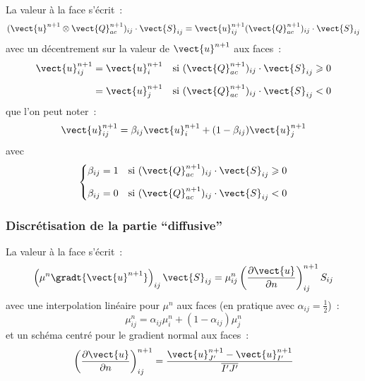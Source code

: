 La valeur à la face s'écrit~:
\begin{equation}
(\vect{u}^{n+1} \otimes \vect{Q}_{ac}^{n+1})_{ij}\cdot \vect{S}_{ij}
= \vect{u}_{ij}^{n+1}(\vect{Q}_{ac}^{n+1})_{ij} \cdot \vect{S}_{ij}
\end{equation}
avec un décentrement sur la valeur de $\vect{u}^{n+1}$ aux faces~:
\begin{equation}
\begin{aligned}
\vect{u}_{ij}^{n+1}
&= \vect{u}_i^{n+1}
&\text{si\ }& (\vect{Q}_{ac}^{n+1})_{ij} \cdot \vect{S}_{ij} \geqslant 0 \\[0.5em]
&= \vect{u}_j^{n+1}
&\text{si\ }& (\vect{Q}_{ac}^{n+1})_{ij} \cdot \vect{S}_{ij} < 0
\end{aligned}
\end{equation}
que l'on peut noter~:
\begin{equation}
\vect{u}_{ij}^{n+1}
 = \beta_{ij}\vect{u}_i^{n+1} + (1-\beta_{ij})\vect{u}_j^{n+1}
\end{equation}
avec
\begin{equation}
\left\{
\begin{aligned}
\beta_{ij} &= 1 &\text{si\ }& (\vect{Q}_{ac}^{n+1})_{ij} \cdot \vect{S}_{ij} \geqslant 0 \\[0.5em]
\beta_{ij} &= 0 &\text{si\ }& (\vect{Q}_{ac}^{n+1})_{ij} \cdot \vect{S}_{ij} < 0
\end{aligned}
\right.
\end{equation}

\subsubsection*{Discrétisation de la partie ``diffusive''}

La valeur à la face s'écrit~:
\begin{equation}
\left(\mu^n\gradt{\vect{u}^{n+1}}\right)_{ij}\vect{S}_{ij}
= \mu_{ij}^n
\displaystyle \left( \frac{\partial \vect{u}}{\partial n} \right)^{n+1}_{ij}
S_{ij}
\end{equation}
avec une interpolation linéaire pour $\mu^n$ aux faces (en pratique avec
$\alpha_{ij}=\frac{1}{2}$)~:
\begin{equation}
\mu_{ij}^n
= \alpha_{ij}\mu_{i}^n+(1-\alpha_{ij})\mu_{j}^n
\end{equation}
et un schéma centré pour le gradient normal aux faces~:
\begin{equation}
\displaystyle \left( \frac{\partial \vect{u}}{\partial n} \right)^{n+1}_{ij}
= \displaystyle\frac{\vect{u}_{J'}^{n+1}-\vect{u}_{I'}^{n+1}}{\overline{I'J'}}
\end{equation}

